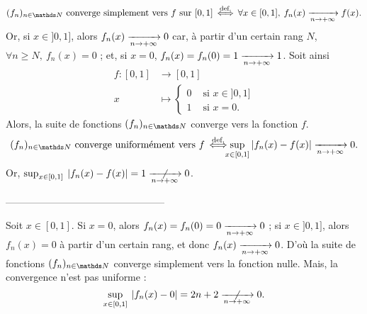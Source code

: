 \begin{exo}
	\[
		(f_n)_{n \in \N} \text{ converge simplement vers } f \text{ sur } [0,1] \iffdef \forall x \in [0,1],\:f_n(x) \tendsto{n\to +\infty} f(x)
	.\]
	Or, si $x \in {]0,1]}$, alors $f_n(x) \xrightarrow[n\to +\infty]{} 0$\/ car, à partir d'un certain rang $N$, $\forall n \ge N,\:f_n(x) = 0$ ; et, si $x = 0$, $f_n(x) = f_n(0) = 1 \xrightarrow[n\to +\infty]{} 1$. Soit ainsi \begin{align*}
		f: [0,1] &\longrightarrow [0,1] \\
		x &\longmapsto \begin{cases}
			0 &\text{ si } x \in {]0,1]}\\
			1 &\text{ si } x = 0.
		\end{cases}
	\end{align*}
	Alors, la suite de fonctions $(f_n)_{n\in\N}$\/ converge vers la fonction $f$.
	\[
		(f_n)_{n\in\N} \text{ converge uniformément vers } f\iffdef\!\!\!\!\sup_{x \in [0,1]}|f_n(x) - f(x)| \tendsto{n\to +\infty} 0
	.\] Or, $\sup_{x \in [0,1]}\:|f_n(x) - f(x)| = 1 \centernot{\tendsto{n\to +\infty}} 0$.

	\bigskip

	\centerline{------------------------------------------------}

	\bigskip

	Soit $x \in [0,1]$. Si $x = 0$, alors $f_n(x) = f_n(0) = 0 \xrightarrow[n \to +\infty]{} 0$\/ ; si $x \in {]0,1]}$, alors $f_n(x) = 0$\/ à partir d'un certain rang, et donc $f_n(x) \xrightarrow[n\to +\infty]{} 0$. D'où la suite de fonctions $(f_n)_{n\in\N}$\/ converge simplement vers la fonction nulle. Mais, la convergence n'est pas uniforme : \[
		\sup_{x \in [0,1]}\:|f_n(x) - 0| = 2n + 2 \centernot{\tendsto{n\to +\infty}} 0
	.\]
\end{exo}

